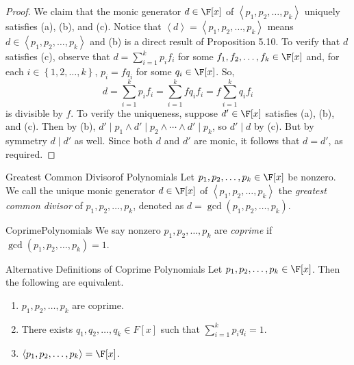 \documentclass[linearalgebra]{subfiles}
\begin{document}
    \begin{proof}
        We claim that the monic generator $d\in \F[x]$ of $\left< p_1, p_2, \ldots, p_k \right>$ uniquely satisfies (a), (b), and (c). Notice that $\left< d \right> = \left< p_1, p_2, \ldots, p_k \right>$ means $d\in \left< p_1, p_2, \ldots, p_k \right>$ and (b) is a direct result of Proposition 5.10. To verify that $d$ satisfies (c), observe that $d = \sum^{k}_{i=1} p_if_i$ for some $f_1, f_2, \ldots, f_k\in \F[x]$ and, for each $i\in \left\lbrace 1, 2, \ldots, k \right\rbrace
        $, $p_i = fq_i$ for some $q_i\in \F[x]$. So,
        \begin{equation*}
            d = \sum^{k}_{i=1} p_if_i = \sum^{k}_{i=1}  fq_if_i = f \sum^{k}_{i=1} q_if_i
        \end{equation*}
        is divisible by $f$. To verify the uniqueness, suppose $d'\in\F[x]$ satisfies (a), (b), and (c). Then by (b), $d'\mid p_1\land d'\mid p_2\land\cdots\land d'\mid p_k$, so $d'\mid d$ by (c). But by symmetry $d\mid d'$ as well. Since both $d$ and $d'$ are monic, it follows that $d=d'$, as required.
    \end{proof}

    \begin{definition}{Greatest Common Divisor}{of Polynomials}
        Let $p_1, p_2, \ldots, p_k\in \F[x]$ be nonzero. We call the unique monic generator $d\in \F[x]$ of $\left< p_1, p_2, \ldots, p_k \right>$ the \emph{greatest common divisor} of $p_1, p_2, \ldots, p_k$, denoted as $d = \gcd \left( p_1, p_2, \ldots, p_k \right)$. 
    \end{definition}

    \begin{definition}{Coprime}{Polynomials}
        We say nonzero $p_1, p_2, \ldots, p_k$ are \emph{coprime} if $\gcd(p_1, p_2, \ldots, p_k) = 1$.
    \end{definition}

    \begin{prop}{Alternative Definitions of Coprime Polynomials}
        Let $p_1, p_2, \ldots, p_k\in \F[x]$. Then the following are equivalent.
        \begin{enumerate}
            \item $p_1, p_2, \ldots, p_k$ are coprime.
            \item There exists $q_1, q_2, \ldots, q_k\in F[x]$ such that $\sum^k_{i=1} p_iq_i = 1$.
            \item $\left< p_1, p_2, \ldots, p_k \right> = \F[x]$. 
        \end{enumerate}
    \end{prop}
\end{document}
